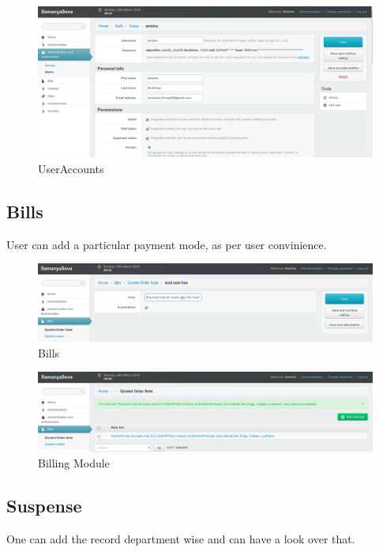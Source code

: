 \begin{figure}[h!]
\centering \includegraphics[scale=0.4]{input/images/after_customer_added.png}
\caption{ UserAccounts}
\label{fig:UI1}
\end{figure}

\subsection{Bills}
User can add a particular payment mode, as per user convinience.

\begin{figure}[h!]
\centering \includegraphics[scale=0.4]{input/images/bills_add.png}
\caption{ Bills}
\label{fig:UI1}
\end{figure}

\begin{figure}[h!]
\centering \includegraphics[scale=0.4]{input/images/bills_added.png}
\caption{ Billing Module}
\label{fig:UI1}
\end{figure}

\subsection{Suspense}
One can add the record department wise and can have a look over that.

